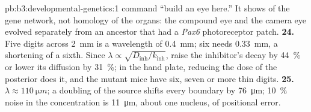 \begin{solution}{pb:b3:developmental-genetics:1}
command ``build an eye here.'' It shows  of the gene
network, not homology of the organs: the compound eye and the camera
eye evolved separately from an ancestor that had a \emph{Pax6}
photoreceptor patch.
\textbf{24.} Five digits across \qty{2}{mm} is a wavelength of
\qty{0.4}{mm}; six needs \qty{0.33}{mm}, a shortening of a sixth.
Since $\lambda \propto \sqrt{D_{\text{inh}}/k_{\text{inh}}}$, raise the
inhibitor's decay by \qty{44}{\%} or lower its diffusion by
\qty{31}{\%}; in the hand plate, reducing the dose of the posterior  does it, and the mutant mice have six, seven or more thin
digits.
\textbf{25.} $\lambda \approx \qty{110}{\micro m}$; a doubling of the
source shifts every boundary by \qty{76}{\micro m}; \qty{10}{\%} noise
in the concentration is \qty{11}{\micro m}, about one nucleus, of
positional error.
\end{solution}
